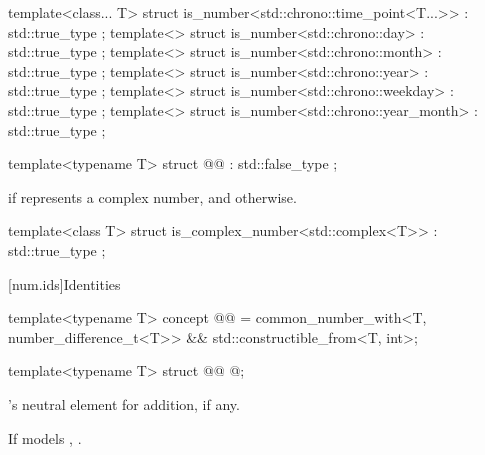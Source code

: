 %
%
%
%
%
%
\begin{itemdecl}
template<class... T>
struct is_number<std::chrono::time_point<T...>> : std::true_type {};
template<>
struct is_number<std::chrono::day> : std::true_type {};
template<>
struct is_number<std::chrono::month> : std::true_type {};
template<>
struct is_number<std::chrono::year> : std::true_type {};
template<>
struct is_number<std::chrono::weekday> : std::true_type {};
template<>
struct is_number<std::chrono::year_month> : std::true_type {};
\end{itemdecl}

\begin{itemdecl}
template<typename T>
struct @@ : std::false_type {};
\end{itemdecl}

\begin{itemdescr}
\pnum
\cvalue
{} if  represents a complex number, and
 otherwise.
\end{itemdescr}

%
\begin{itemdecl}
template<class T>
struct is_complex_number<std::complex<T>> : std::true_type {};
\end{itemdecl}

[num.ids]{Identities}

\begin{codeblock}
template<typename T>
concept @@ =
  common_number_with<T, number_difference_t<T>> && std::constructible_from<T, int>;
\end{codeblock}

%
\begin{itemdecl}
template<typename T>
struct @@ { @\seebelow@ };
\end{itemdecl}

\begin{itemdescr}
\pnum
\cvalue
{}'s neutral element for addition, if any.

\pnum
\dvalue
If  models , .
\end{itemdescr}

